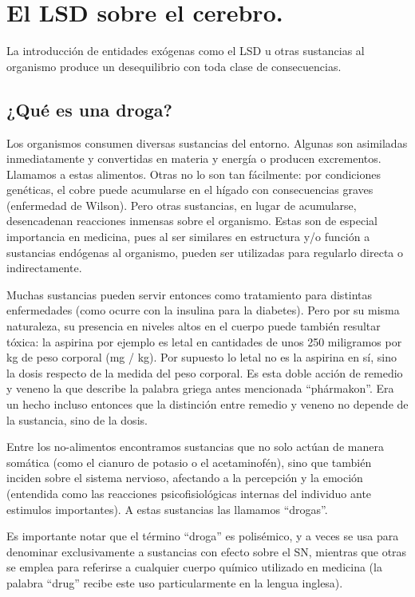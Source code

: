 \section{El LSD sobre el cerebro.}

La introducción de entidades exógenas como el LSD u otras sustancias al organismo produce un desequilibrio con toda clase de consecuencias.

\subsection{¿Qué es una droga?}

Los organismos consumen diversas sustancias del entorno. Algunas son asimiladas inmediatamente y convertidas en materia y energía o producen excrementos. Llamamos a estas alimentos. Otras no lo son tan fácilmente: por condiciones genéticas, el cobre puede acumularse en el hígado con consecuencias graves (enfermedad de Wilson). Pero otras sustancias, en lugar de acumularse, desencadenan reacciones inmensas sobre el organismo. Estas son de especial importancia en medicina, pues al ser similares en estructura y/o función a sustancias endógenas al organismo, pueden ser utilizadas para regularlo directa o indirectamente.

Muchas sustancias pueden servir entonces como tratamiento para distintas enfermedades (como ocurre con la insulina para la diabetes). Pero por su misma naturaleza, su presencia en niveles altos en el cuerpo puede también resultar tóxica: la aspirina por ejemplo es letal en cantidades de unos 250 miligramos por kg de peso corporal (mg / kg). Por supuesto lo letal no es la aspirina en sí, sino la dosis respecto de la medida del peso corporal. Es esta doble acción de remedio y veneno la que describe la palabra griega antes mencionada \enquote{phármakon}. Era un hecho incluso entonces que la distinción entre remedio y veneno no depende de la sustancia, sino de la dosis.

Entre los no-alimentos encontramos sustancias que no solo actúan de manera somática (como el cianuro de potasio o el acetaminofén), sino que también inciden sobre el sistema nervioso, afectando a la percepción y la emoción (entendida como las reacciones psicofisiológicas internas del individuo ante estimulos importantes). A estas sustancias las llamamos \enquote{drogas}.

Es importante notar que el término \enquote{droga} es polisémico, y a veces se usa para denominar exclusivamente a sustancias con efecto sobre el SN, mientras que otras se emplea para referirse a cualquier cuerpo químico utilizado en medicina (la palabra \enquote{drug} recibe este uso particularmente en la lengua inglesa).


